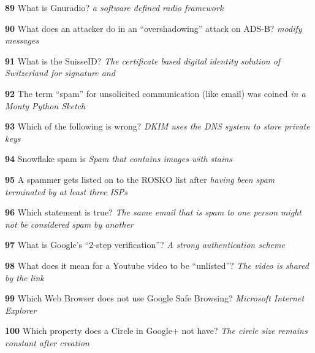 \textbf{  89}  What is Gnuradio?  
\textit{ a software defined radio framework}

\textbf{  90}  What does an attacker do in an “overshadowing” attack on ADS-B?  
\textit{ modify messages}

\textbf{  91}  What is the SuisseID?  
\textit{ The certificate based digital identity solution of Switzerland for signature and}

\textbf{  92}  The term “spam” for unsolicited communication (like email) was coined  
\textit{ in a Monty Python Sketch}

\textbf{  93}  Which of the following is wrong?  
\textit{ DKIM uses the DNS system to store private keys}

\textbf{  94}  Snowflake spam is  
\textit{ Spam that contains images with stains}

\textbf{  95}  A spammer gets listed on to the ROSKO list after  
\textit{ having been spam terminated by at least three ISPs}

\textbf{  96}  Which statement is true?  
\textit{ The same email that is spam to one person might not be considered spam by another}

\textbf{  97}  What is Google's ``2-step verification''?
\textit{ A strong authentication scheme}

\textbf{  98}  What does it mean for a Youtube video to be “unlisted”?  
\textit{ The video is shared by the link}

\textbf{  99}  Which Web Browser does not use Google Safe Browsing?  
\textit{ Microsoft Internet Explorer}

\textbf{  100}  Which property does a Circle in Google+ not have? 
\textit{ The circle size remains constant after creation}

